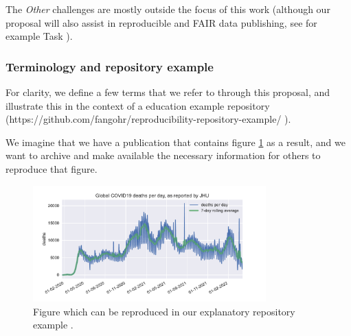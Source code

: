 The \emph{Other} challenges are mostly outside the focus of this work
(although our proposal will also assist in reproducible and FAIR data
publishing, see for example Task ).


\subsubsection{Terminology and repository example}

For clarity, we define a few terms that we refer to through this proposal, and
illustrate this in the context of a education example repository
(https://github.com/fangohr/reproducibility-repository-example/
\cite{ReproducibilityRepositoryExample2022}).

We imagine that we have a publication that contains figure
\ref{fig:reproducibility-example-covid} as a result, and we want to archive and
make available the necessary information for others to reproduce that figure.

\begin{figure}
  \centering
  \includegraphics[width=0.8\textwidth]{images/figure1.pdf}
  \caption{Figure which can be reproduced in our explanatory repository example
    \cite{ReproducibilityRepositoryExample2022}. \label{fig:reproducibility-example-covid}}
\end{figure}

